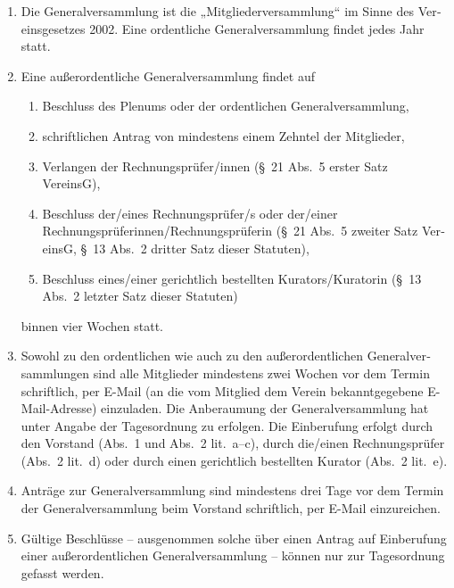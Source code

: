 \begin{otherlanguage}{german}

\begin{enumerate}[statutenenum]
    \item Die Generalversammlung ist die „Mitgliederversammlung“ im Sinne des Vereinsgesetzes 2002.
        Eine ordentliche Generalversammlung findet jedes Jahr statt.

    \item Eine außerordentliche Generalversammlung findet auf
        \begin{enumerate}[statutenenum]
            \item Beschluss des Plenums oder der ordentlichen Generalversammlung,

            \item schriftlichen Antrag von mindestens einem Zehntel der Mitglieder,

            \item Verlangen der Rechnungsprüfer/innen (\S\ 21 Abs.\ 5 erster Satz VereinsG),

            \item Beschluss der/eines Rechnungsprüfer/s oder der/einer Rechnungsprüferinnen/Rechnungsprüferin (\S\ 21 Abs.\ 5 zweiter Satz VereinsG, \S\ 13 Abs.\ 2 dritter Satz dieser Statuten),

            \item Beschluss eines/einer gerichtlich bestellten Kurators/Kuratorin (\S\ 13 Abs.\ 2 letzter Satz dieser Statuten)
        \end{enumerate}
        binnen vier Wochen statt.

    \item Sowohl zu den ordentlichen wie auch zu den außerordentlichen Generalversammlungen sind alle Mitglieder mindestens zwei Wochen vor dem Termin schriftlich, per E-Mail (an die vom Mitglied dem Verein bekanntgegebene E-Mail-Adresse) einzuladen.
        Die Anberaumung der Generalversammlung hat unter Angabe der Tagesordnung zu erfolgen.
        Die Einberufung erfolgt durch den Vorstand (Abs.\ 1 und Abs.\ 2 lit.\ a--c), durch die/einen Rechnungsprüfer (Abs.\ 2 lit.\ d) oder durch einen gerichtlich bestellten Kurator (Abs.\ 2 lit.\ e).

    \item Anträge zur Generalversammlung sind mindestens drei Tage vor dem Termin der Generalversammlung beim Vorstand schriftlich, per E-Mail einzureichen.

    \item Gültige Beschlüsse -- ausgenommen solche über einen Antrag auf Einberufung einer außerordentlichen Generalversammlung -- können nur zur Tagesordnung gefasst werden.


\end{enumerate}
\end{otherlanguage}
